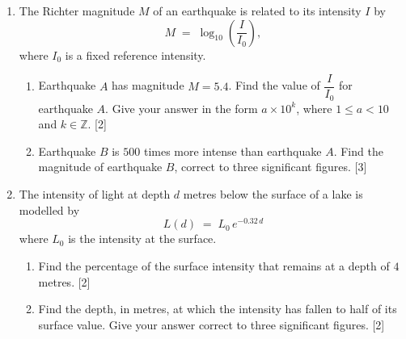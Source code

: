\documentclass[12pt, twoside]{article}
\begin{document}
\begin{enumerate}[itemsep=0.15cm]

\newpage

\item[5.] [Maximum mark: 5]

The Richter magnitude $M$ of an earthquake is related to its intensity
$I$ by
$$M \;=\; \log_{10}\!\left(\dfrac{I}{I_{0}}\right),$$
where $I_{0}$ is a fixed reference intensity.

\begin{enumerate}[itemsep=0.1cm]
  \item Earthquake $A$ has magnitude $M = 5.4$. Find the value of
  $\dfrac{I}{I_{0}}$ for earthquake $A$. Give your answer in the
  form $a \times 10^{k}$, where $1 \le a < 10$ and $k \in
  \mathbb{Z}$. \hfill [2]
  \item Earthquake $B$ is $500$ times more intense than earthquake
  $A$. Find the magnitude of earthquake $B$, correct to three
  significant figures. \hfill [3]
\end{enumerate}


\newpage

\item[6.] [Maximum mark: 4]

The intensity of light at depth $d$ metres below the surface of a
lake is modelled by
$$L(d) \;=\; L_{0}\, e^{-0.32\, d}$$
where $L_{0}$ is the intensity at the surface.

\begin{enumerate}[itemsep=0.1cm]
  \item Find the percentage of the surface intensity that remains at
  a depth of $4$ metres. \hfill [2]
  \item Find the depth, in metres, at which the intensity has fallen
  to half of its surface value. Give your answer correct to three
  significant figures. \hfill [2]
\end{enumerate}


\end{enumerate}
\end{document}
